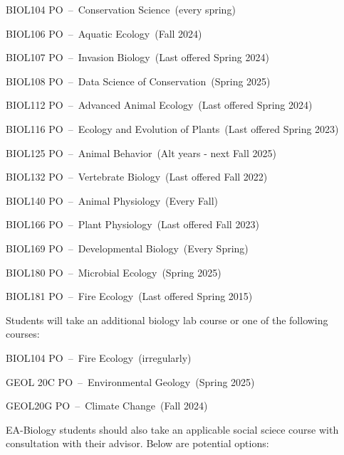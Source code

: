 \documentclass{article}\usepackage[]{graphicx}\usepackage[]{xcolor}
\newenvironment{itemize*}%
  {\begin{itemize}%
    \setlength{\itemsep}{0pt}%
    \setlength{\parskip}{0pt}}%
  {\end{itemize}}
\begin{document}
\begin{description}
\begin{itemize*}
  \item BIOL104 PO~--~Conservation Science~(every spring)
  \item BIOL106 PO~--~Aquatic Ecology~(Fall 2024)
  \item BIOL107 PO~--~Invasion Biology~(Last offered Spring 2024)
  \item BIOL108 PO~--~Data Science of Conservation~(Spring 2025)
  \item BIOL112 PO~--~Advanced Animal Ecology~(Last offered Spring 2024)
  \item BIOL116 PO~--~Ecology and Evolution of Plants~(Last offered Spring 2023)
  \item BIOL125 PO~--~Animal Behavior~(Alt years - next Fall 2025)
  \item BIOL132 PO~--~Vertebrate Biology~(Last offered Fall 2022)
  \item BIOL140 PO~--~Animal Physiology~(Every  Fall)
  \item BIOL166 PO~--~Plant Physiology~(Last  offered Fall 2023)
  \item BIOL169 PO~--~Developmental Biology~(Every Spring)
  \item BIOL180 PO~--~Microbial Ecology~(Spring 2025)
  \item BIOL181 PO~--~Fire Ecology~(Last offered Spring 2015)
\end{itemize*}

\item[Seminar and Geology Options] Students will take an additional biology lab course or one of the following courses:

\begin{itemize*}
  \item BIOL104 PO~--~Fire Ecology~(irregularly)
  \item GEOL 20C PO~--~Environmental Geology~(Spring 2025)
  \item GEOL20G PO~--~Climate Change~(Fall 2024)
\end{itemize*}

\item[Social Sciences] EA-Biology students should also take an applicable social sciece course with consultation with their advisor. Below are potential options: 


\end{description}
\end{document}
